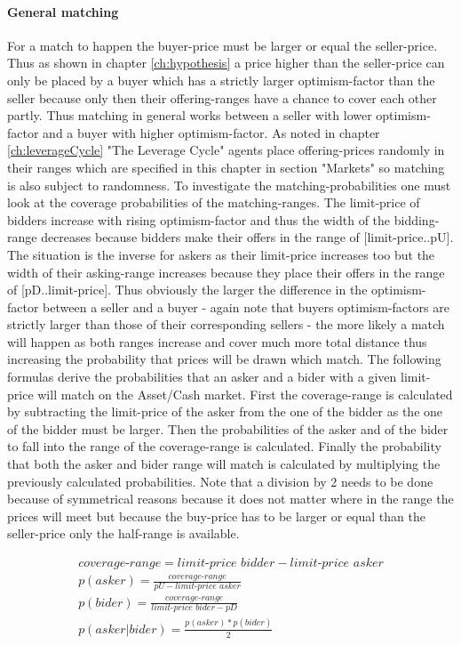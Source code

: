 \documentclass[Bachelorarbeit.tex]{subfiles}
\begin{document}
\paragraph{General matching}
For a match to happen the buyer-price must be larger or equal the seller-price. Thus as shown in chapter \ref{ch:hypothesis} a price higher than the seller-price can only be placed by a buyer which has a strictly larger optimism-factor than the seller because only then their offering-ranges have a chance to cover each other partly. Thus matching in general works between a seller with lower optimism-factor and a buyer with higher optimism-factor. As noted in chapter \ref{ch:leverageCycle} "The Leverage Cycle" agents place offering-prices randomly in their ranges which are specified in this chapter in section "Markets" so matching is also subject to randomness.
\medskip
To investigate the matching-probabilities one must look at the coverage probabilities of the matching-ranges. The limit-price of bidders increase with rising optimism-factor and thus the width of the bidding-range decreases because bidders make their offers in the range of [limit-price..pU]. The situation is the inverse for askers as their limit-price increases too but the width of their asking-range increases because they place their offers in the range of [pD..limit-price]. Thus obviously the larger the difference in the optimism-factor between a seller and a buyer - again note that buyers optimism-factors are strictly larger than those of their corresponding sellers - the more likely a match will happen as both ranges increase and cover much more total distance thus increasing the probability that prices will be drawn which match.
\medskip
The following formulas derive the probabilities that an asker and a bider with a given limit-price will match on the Asset/Cash market. First the coverage-range is calculated by subtracting the limit-price of the asker from the one of the bidder as the one of the bidder must be larger. Then the probabilities of the asker and of the bider to fall into the range of the coverage-range is calculated. Finally the probability that both the asker and bider range will match is calculated by multiplying the previously calculated probabilities. Note that a division by 2 needs to be done because of symmetrical reasons because it does not matter where in the range the prices will meet but because the buy-price has to be larger or equal than the seller-price only the half-range is available.

\begin{equation}
\begin{split}
\textit{coverage-range} = \textit{limit-price bidder} - \textit{limit-price asker} \\
p(asker) = \frac{\textit{coverage-range}}{ pU - \textit{limit-price asker} } \\
p(bider) = \frac{\textit{coverage-range}}{ \textit{limit-price bider} - pD } \\
p(asker | bider) = \frac{p(asker) * p(bider)}{2}
\end{split}
\end{equation}
\end{document}
